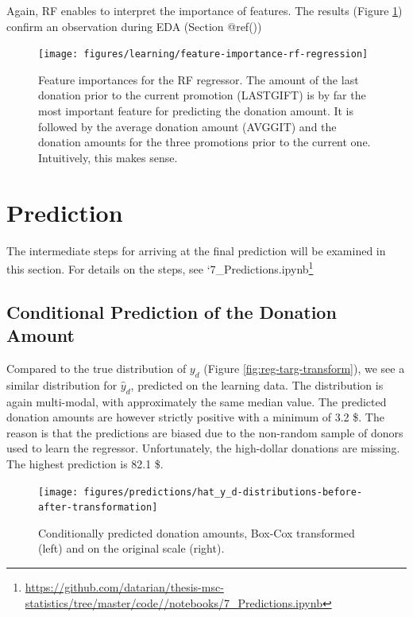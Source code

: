 \documentclass[
  11pt,
  a4paper,
  DIV=12,captions=tableheading,oneside,titlepage]{scrbook}
\begin{document}
Again, RF enables to interpret the importance of features. The results (Figure \ref{fig:reg-importance}) confirm an observation during EDA (Section @ref())



\begin{figure}

{\centering \texttt{[image: figures/learning/feature-importance-rf-regression]} 

}

\caption{Feature importances for the RF regressor. The amount of the last donation prior to the current promotion (LASTGIFT) is by far the most important feature for predicting the donation amount. It is followed by the average donation amount (AVGGIT) and the donation amounts for the three promotions prior to the current one. Intuitively, this makes sense.}\label{fig:reg-importance}
\end{figure}

\hypertarget{prediction}{%
\section{Prediction}\label{prediction}}

The intermediate steps for arriving at the final prediction will be examined in this section. For details on the steps, see `7\_Predictions.ipynb\footnote{\url{https://github.com/datarian/thesis-msc-statistics/tree/master/code//notebooks/7_Predictions.ipynb}}

\hypertarget{conditional-prediction-of-the-donation-amount}{%
\subsection{Conditional Prediction of the Donation Amount}\label{conditional-prediction-of-the-donation-amount}}

Compared to the true distribution of \(y_d\) (Figure \ref{fig:reg-targ-transform}), we see a similar distribution for \(\hat{y}_d\), predicted on the learning data. The distribution is again multi-modal, with approximately the same median value. The predicted donation amounts are however strictly positive with a minimum of 3.2 \$. The reason is that the predictions are biased due to the non-random sample of donors used to learn the regressor. Unfortunately, the high-dollar donations are missing. The highest prediction is 82.1 \$.



\begin{figure}

{\centering \texttt{[image: figures/predictions/hat\_y\_d-distributions-before-after-transformation]} 

}

\caption{Conditionally predicted donation amounts, Box-Cox transformed (left) and on the original scale (right).}\label{fig:y-d-predict}
\end{figure}
\end{document}
